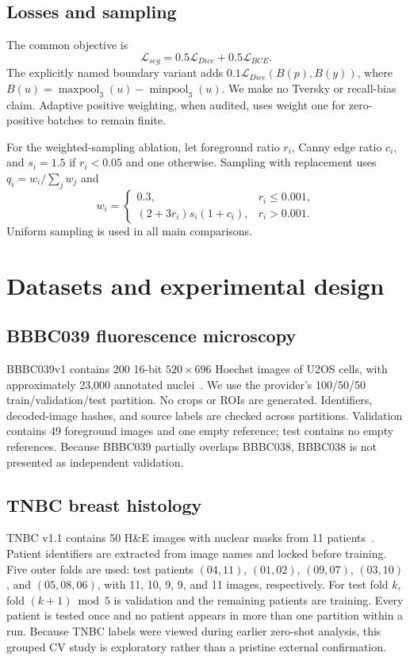 \documentclass{article}
\begin{document}
\subsection{Losses and sampling}
The common objective is
\begin{equation}
\mathcal L_{seg}=0.5\mathcal L_{Dice}+0.5\mathcal L_{BCE}.
\end{equation}
The explicitly named boundary variant adds $0.1\mathcal L_{Dice}(B(p),B(y))$, where $B(u)=\operatorname{maxpool}_3(u)-\operatorname{minpool}_3(u)$. We make no Tversky or recall-bias claim. Adaptive positive weighting, when audited, uses weight one for zero-positive batches to remain finite.

For the weighted-sampling ablation, let foreground ratio $r_i$, Canny edge ratio $c_i$, and $s_i=1.5$ if $r_i<0.05$ and one otherwise. Sampling with replacement uses $q_i=w_i/\sum_jw_j$ and
\begin{equation}
w_i=\begin{cases}0.3,&r_i\le0.001,\\(2+3r_i)s_i(1+c_i),&r_i>0.001.\end{cases}
\end{equation}
Uniform sampling is used in all main comparisons.

\section{Datasets and experimental design}
\subsection{BBBC039 fluorescence microscopy}
BBBC039v1 contains 200 16-bit $520\!\times\!696$ Hoechst images of U2OS cells, with approximately 23,000 annotated nuclei~\cite{ljosa2012annotated,caicedo2019nucleus}. We use the provider's 100/50/50 train/validation/test partition. No crops or ROIs are generated. Identifiers, decoded-image hashes, and source labels are checked across partitions. Validation contains 49 foreground images and one empty reference; test contains no empty references. Because BBBC039 partially overlaps BBBC038, BBBC038 is not presented as independent validation.

\subsection{TNBC breast histology}
TNBC v1.1 contains 50 H\&E images with nuclear masks from 11 patients~\cite{naylor2019segmentation}. Patient identifiers are extracted from image names and locked before training. Five outer folds are used: test patients $(04,11)$, $(01,02)$, $(09,07)$, $(03,10)$, and $(05,08,06)$, with 11, 10, 9, 9, and 11 images, respectively. For test fold $k$, fold $(k+1)\bmod5$ is validation and the remaining patients are training. Every patient is tested once and no patient appears in more than one partition within a run. Because TNBC labels were viewed during earlier zero-shot analysis, this grouped CV study is exploratory rather than a pristine external confirmation.
\end{document}
